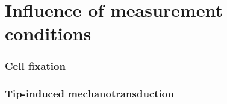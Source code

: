 \part{Influence of measurement conditions}

\section{Cell fixation}

\section{Tip-induced mechanotransduction}\label{sec:tip-induced_mechanotransduction}
